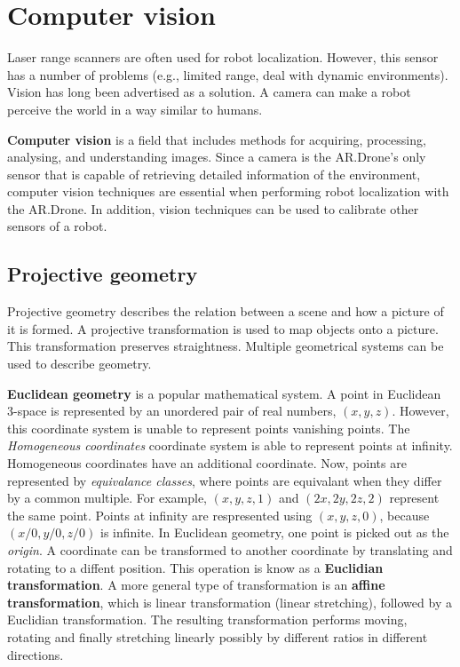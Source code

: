\begin{comment}
Particle filters overcome the limitations of using a Gaussian to represent a probability distribution.
With sufficient samples, they approach the Bayesian optimal estimate, so they can be made more accurate than either the EKF or UKF.
The increased representational power of particle filters comes at the cost of higher computational complexity.
And, when the number of particles is unsufficient, the particle filter might suffer from sample impoverishment.
\end{comment}


\section{Computer vision}
Laser range scanners are often used for robot localization.
However, this sensor has a number of problems (e.g., limited range, deal with dynamic environments).
Vision has long been advertised as a solution.
A camera can make a robot perceive the world in a way similar to humans.

\textbf{Computer vision} is a field that includes methods for acquiring, processing, analysing, and understanding images.
Since a camera is the AR.Drone's only sensor that is capable of retrieving detailed information of the environment, computer vision techniques are essential when performing robot localization with the AR.Drone.
In addition, vision techniques can be used to calibrate other sensors of a robot.

\subsection{Projective geometry}
\label{sec:background-projective-geometry}
Projective geometry describes the relation between a scene and how a picture of it is formed.
A projective transformation is used to map objects onto a picture.
This transformation preserves straightness.
Multiple geometrical systems can be used to describe geometry.

\textbf{Euclidean geometry} is a popular mathematical system.
A point in Euclidean 3-space is represented by an unordered pair of real numbers, $(x, y, z)$.
However, this coordinate system is unable to represent points vanishing points.
The \textit{Homogeneous coordinates} coordinate system is able to represent points at infinity.
Homogeneous coordinates have an additional coordinate.
Now, points are represented by \textit{equivalance classes}, where points are equivalant when they differ by a common multiple.
For example, $(x, y, z, 1)$ and $(2x, 2y, 2z, 2)$ represent the same point.
Points at infinity are respresented using $(x, y, z, 0)$, because $(x/0, y/0, z/0)$ is infinite.
In Euclidean geometry, one point is picked out as the \textit{origin}.
A coordinate can be transformed to another coordinate by translating and rotating to a diffent position.
This operation is know as a \textbf{Euclidian transformation}.
A more general type of transformation is an \textbf{affine transformation}, which is linear transformation (linear stretching), followed by a Euclidian transformation.
The resulting transformation performs moving, rotating and finally stretching linearly possibly by different ratios in different directions.

